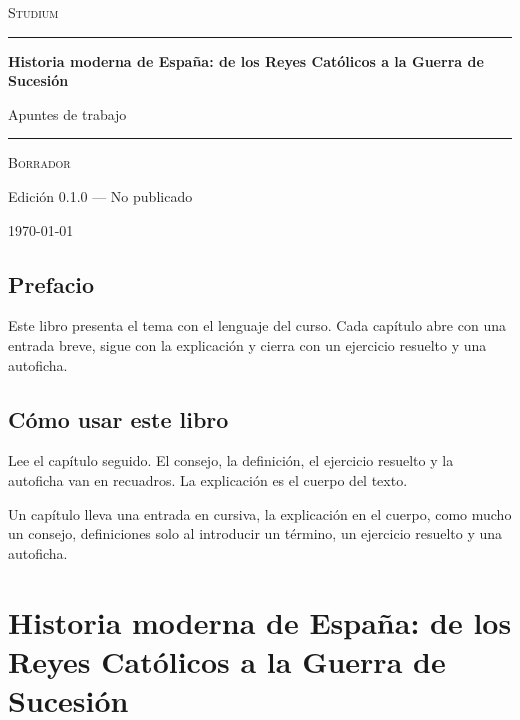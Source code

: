 \documentclass{book}
\begin{document}
\frontmatter
\ifdefined\studiumcustomtitle
\studiumcustomtitle
\else
\thispagestyle{empty}
\setlength{\parindent}{0pt}
\vspace*{0.08\textheight}
{\normalsize\scshape\color{studiumInk} Studium\par}
\vspace{0.55em}
{\color{studiumRule}\rule{\linewidth}{0.9pt}\par}
\vspace{0.16\textheight}
{\raggedright\Huge\bfseries Historia moderna de España: de los Reyes Católicos a la Guerra de Sucesión\par}
\vspace{0.9em}
{\raggedright\Large\color{studiumInk} Apuntes de trabajo\par}
\vfill
{\color{studiumRule}\rule{0.36\linewidth}{0.45pt}\par}
\vspace{1.05em}
{\large\scshape Borrador\par}
\vspace{0.45em}
{\normalsize Edición 0.1.0 --- No publicado\par}
\vspace{0.4em}
{\normalsize\today\par}
\vspace*{0.08\textheight}
\clearpage
\fi
\chapter{Prefacio}
\noindent Este libro presenta el tema con el lenguaje del curso. Cada capítulo abre con una entrada breve, sigue con la explicación y cierra con un ejercicio resuelto y una autoficha.
\chapter{Cómo usar este libro}
\noindent Lee el capítulo seguido. El consejo, la definición, el ejercicio resuelto y la autoficha van en recuadros. La explicación es el cuerpo del texto.

\noindent Un capítulo lleva una entrada en cursiva, la explicación en el cuerpo, como mucho un consejo, definiciones solo al introducir un término, un ejercicio resuelto y una autoficha.
\tableofcontents
\mainmatter
\part{Historia moderna de España: de los Reyes Católicos a la Guerra de Sucesión}
\end{document}
